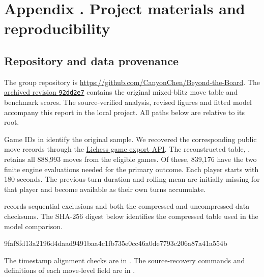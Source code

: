 \label{app:reproducibility}
\section*{Appendix \thesection. Project materials and reproducibility}

\subsection{Repository and data provenance}
The group repository is \url{https://github.com/CanyonChen/Beyond-the-Board}. The
\href{https://github.com/CanyonChen/Beyond-the-Board/tree/92dd2e7c60d5f3efc5950686f538bdd42e310a98}{archived revision \texttt{92dd2e7}}
contains the original mixed-blitz move table and benchmark scores. The source-verified analysis, revised figures and fitted model accompany this report in the local project. All paths below are relative to its root.

Game IDs in  identify the original sample. We recovered the corresponding public move records through the \href{https://lichess.org/api#tag/Games}{Lichess game export API}. The reconstructed table, , retains all 888,993 moves from the eligible games. Of these, 839,176 have the two finite engine evaluations needed for the primary outcome. Each player starts with 180 seconds. The previous-turn duration and rolling mean are initially missing for that player and become available as their own turns accumulate.

 records sequential exclusions and both the compressed and uncompressed data checksums. The SHA-256 digest below identifies the compressed table used in the model comparison.
\begin{center}\small\ttfamily
9faf8fd13a2196d4daad9491baa4c1fb735e0cc46a0de7793c206a87a41a554b
\end{center}
The timestamp alignment checks are in . The source-recovery commands and definitions of each move-level field are in .

